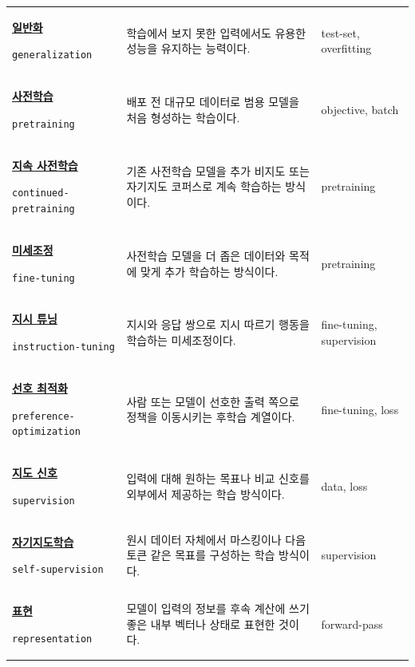 \begin{longtable}{p{} p{} p{}}
\hypertarget{glossary:generalization}{\hyperref[bg:generalization]{\textbf{일반화}}} \newline\texttt{generalization} & 학습에서 보지 못한 입력에서도 유용한 성능을 유지하는 능력이다. & \scriptsize test-set, overfitting \\
\hypertarget{glossary:pretraining}{\hyperref[bg:pretraining]{\textbf{사전학습}}} \newline\texttt{pretraining} & 배포 전 대규모 데이터로 범용 모델을 처음 형성하는 학습이다. & \scriptsize objective, batch \\
\hypertarget{glossary:continued-pretraining}{\hyperref[bg:continued-pretraining]{\textbf{지속 사전학습}}} \newline\texttt{continued-pretraining} & 기존 사전학습 모델을 추가 비지도 또는 자기지도 코퍼스로 계속 학습하는 방식이다. & \scriptsize pretraining \\
\hypertarget{glossary:fine-tuning}{\hyperref[bg:fine-tuning]{\textbf{미세조정}}} \newline\texttt{fine-tuning} & 사전학습 모델을 더 좁은 데이터와 목적에 맞게 추가 학습하는 방식이다. & \scriptsize pretraining \\
\hypertarget{glossary:instruction-tuning}{\hyperref[bg:instruction-tuning]{\textbf{지시 튜닝}}} \newline\texttt{instruction-tuning} & 지시와 응답 쌍으로 지시 따르기 행동을 학습하는 미세조정이다. & \scriptsize fine-tuning, supervision \\
\hypertarget{glossary:preference-optimization}{\hyperref[bg:preference-optimization]{\textbf{선호 최적화}}} \newline\texttt{preference-optimization} & 사람 또는 모델이 선호한 출력 쪽으로 정책을 이동시키는 후학습 계열이다. & \scriptsize fine-tuning, loss \\
\hypertarget{glossary:supervision}{\hyperref[bg:supervision]{\textbf{지도 신호}}} \newline\texttt{supervision} & 입력에 대해 원하는 목표나 비교 신호를 외부에서 제공하는 학습 방식이다. & \scriptsize data, loss \\
\hypertarget{glossary:self-supervision}{\hyperref[bg:self-supervision]{\textbf{자기지도학습}}} \newline\texttt{self-supervision} & 원시 데이터 자체에서 마스킹이나 다음 토큰 같은 목표를 구성하는 학습 방식이다. & \scriptsize supervision \\
\hypertarget{glossary:representation}{\hyperref[bg:representation]{\textbf{표현}}} \newline\texttt{representation} & 모델이 입력의 정보를 후속 계산에 쓰기 좋은 내부 벡터나 상태로 표현한 것이다. & \scriptsize forward-pass \\

\end{longtable}
